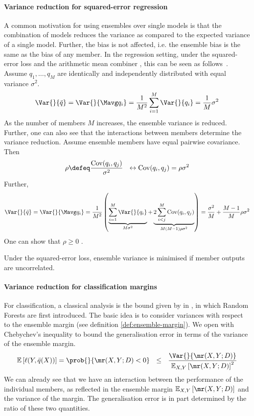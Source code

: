 \documentclass[
    a4paper, %
	fontsize=10pt, %
	twoside=false, %
]{kaobook}
\begin{document}
\begin{titlepage}
\paragraph{Variance reduction for squared-error regression} 
A common motivation for using ensembles over single models is that the combination of models reduces the variance as compared to the expected variance of a single model. Further, the bias is not affected, i.e. the ensemble bias is the same as the bias of any member.
In the regression setting, under the squared-error loss and the arithmetic mean combiner%
, this can be seen as follows~\cite{stackexchange}. Assume $q_{1}, \dots, q_{M}$ are identically and independently distributed with equal variance $\sigma^2$.
$$
	\Var{}{\bar{q}} = \Var{}{\Mavg q_{i}} = \frac{1}{M^2} \sum_{i=1}^M \Var{}{q_{i}} = \frac{1}{M} \sigma^2
$$
As the number of members $M$ increases, the ensemble variance is reduced. Further, one can also see that the interactions between members determine the variance reduction. Assume ensemble members have equal pairwise covariance. Then 
$$
\rho \defeq \frac{\text{Cov}(q_{i}, q_{j})}{\sigma^2} ~ ~ \leftrightarrow \text{Cov}(q_{i}, q_{j}) = \rho \sigma^2
$$
Further, 
$$
\Var{}{\bar{q}} = \Var{}{\Mavg q_{i}} = \frac{1}{M^2} \left( 
\underbrace{
\sum_{i=1}^M \Var{}{q_{i}}
}_{M\sigma^2}
+
\underbrace{
2 \sum_{i<j}^M \text{Cov}(q_{i}, q_{j})
}_{M(M-1)\rho \sigma^2}
\right)
= \frac{\sigma^2}{M} + \frac{M-1}{M} \rho \sigma^2
$$
One can show that $\rho \geq 0$ \cite{louppe_UnderstandingRandomForests_2015}. 
\begin{corollary}
  Under the squared-error loss, ensemble variance is minimised if member outputs are uncorrelated.
\end{corollary}

\paragraph{Variance reduction for classification margins} For classification, a classical analysis is the bound given by \citeauthor{breiman_RandomForests_2001} in \cite{breiman_RandomForests_2001}, in which Random Forests are first introduced. The basic idea is to consider variances with respect to the ensemble margin (see definition \ref{def:ensemble-margin}).
We open with Chebychev's inequality to bound the generalisation error in terms of the variance of the ensemble margin.
$$
\mathbb{E}\left[ \ell(Y, \bar{q}(X)) \right]  = \prob{}{\mr(X, Y; D) < 0 }  ~ ~ \leq ~ ~ \frac{\Var{}{\mr(X, Y; D)  }}{\mathbb{E}_{X,Y}\left[ \mr(X, Y; D)  \right]^2}
$$
We can already see that we have an interaction between the performance of the individual members, as reflected in the ensemble margin $\mathbb{E}_{X,Y}\left[ \mr(X, Y; D)  \right]$ and the variance of the margin.
The generalisation error is in part determined by the ratio of these two quantities.


\end{titlepage}
\end{document}

